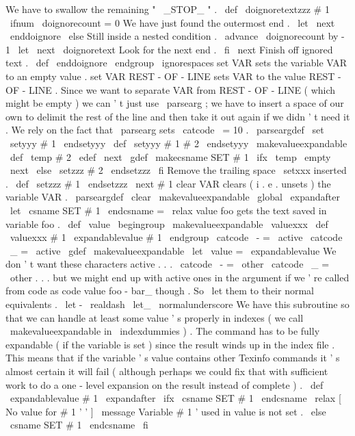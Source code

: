 %
We
have
to
swallow
the
remaining
"
\
_STOP_
"
.
%
\
def
\
doignoretextzzz
#
1
{
%
\
ifnum
\
doignorecount
=
0
%
We
have
just
found
the
outermost
end
.
\
let
\
next
\
enddoignore
\
else
%
Still
inside
a
nested
condition
.
\
advance
\
doignorecount
by
-
1
\
let
\
next
\
doignoretext
%
Look
for
the
next
end
.
\
fi
\
next
}
%
Finish
off
ignored
text
.
\
def
\
enddoignore
{
\
endgroup
\
ignorespaces
}
%
set
VAR
sets
the
variable
VAR
to
an
empty
value
.
%
set
VAR
REST
-
OF
-
LINE
sets
VAR
to
the
value
REST
-
OF
-
LINE
.
%
%
Since
we
want
to
separate
VAR
from
REST
-
OF
-
LINE
(
which
might
be
%
empty
)
we
can
'
t
just
use
\
parsearg
;
we
have
to
insert
a
space
of
our
%
own
to
delimit
the
rest
of
the
line
and
then
take
it
out
again
if
we
%
didn
'
t
need
it
.
%
We
rely
on
the
fact
that
\
parsearg
sets
\
catcode
\
=
10
.
%
\
parseargdef
\
set
{
\
setyyy
#
1
\
endsetyyy
}
\
def
\
setyyy
#
1
#
2
\
endsetyyy
{
%
{
%
\
makevalueexpandable
\
def
\
temp
{
#
2
}
%
\
edef
\
next
{
\
gdef
\
makecsname
{
SET
#
1
}
}
%
\
ifx
\
temp
\
empty
\
next
{
}
%
\
else
\
setzzz
#
2
\
endsetzzz
\
fi
}
%
}
%
Remove
the
trailing
space
\
setxxx
inserted
.
\
def
\
setzzz
#
1
\
endsetzzz
{
\
next
{
#
1
}
}
%
clear
VAR
clears
(
i
.
e
.
unsets
)
the
variable
VAR
.
%
\
parseargdef
\
clear
{
%
{
%
\
makevalueexpandable
\
global
\
expandafter
\
let
\
csname
SET
#
1
\
endcsname
=
\
relax
}
%
}
%
value
{
foo
}
gets
the
text
saved
in
variable
foo
.
\
def
\
value
{
\
begingroup
\
makevalueexpandable
\
valuexxx
}
\
def
\
valuexxx
#
1
{
\
expandablevalue
{
#
1
}
\
endgroup
}
{
\
catcode
\
-
=
\
active
\
catcode
\
_
=
\
active
%
\
gdef
\
makevalueexpandable
{
%
\
let
\
value
=
\
expandablevalue
%
We
don
'
t
want
these
characters
active
.
.
.
\
catcode
\
-
=
\
other
\
catcode
\
_
=
\
other
%
.
.
.
but
we
might
end
up
with
active
ones
in
the
argument
if
%
we
'
re
called
from
code
as
code
{
value
{
foo
-
bar_
}
}
though
.
%
So
\
let
them
to
their
normal
equivalents
.
\
let
-
\
realdash
\
let_
\
normalunderscore
}
}
%
We
have
this
subroutine
so
that
we
can
handle
at
least
some
value
'
s
%
properly
in
indexes
(
we
call
\
makevalueexpandable
in
\
indexdummies
)
.
%
The
command
has
to
be
fully
expandable
(
if
the
variable
is
set
)
since
%
the
result
winds
up
in
the
index
file
.
This
means
that
if
the
%
variable
'
s
value
contains
other
Texinfo
commands
it
'
s
almost
certain
%
it
will
fail
(
although
perhaps
we
could
fix
that
with
sufficient
work
%
to
do
a
one
-
level
expansion
on
the
result
instead
of
complete
)
.
%
\
def
\
expandablevalue
#
1
{
%
\
expandafter
\
ifx
\
csname
SET
#
1
\
endcsname
\
relax
{
[
No
value
for
#
1
'
'
]
}
%
\
message
{
Variable
#
1
'
used
in
value
is
not
set
.
}
%
\
else
\
csname
SET
#
1
\
endcsname
\
fi
}
